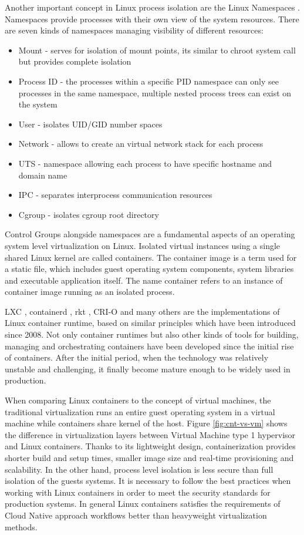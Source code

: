 \documentclass[
  digital, %
  twoside, %
  table,   %
  lof,     %
  lot,     %
]{fithesis3}
\begin{document}
Another important concept in Linux process isolation are the Linux Namespaces \cite{linux_namespaces}. Namespaces provide processes with their own view of the system resources. There are seven kinds of namespaces managing visibility of different resources:
\begin{itemize}
  \item Mount - serves for isolation of mount points, its similar to chroot system call but provides complete isolation
  \item Process ID - the processes within a specific PID namespace can only see processes in the same namespace, multiple nested process trees can exist on the system
  \item User - isolates UID/GID number spaces
  \item Network - allows to create an virtual network stack for each process
  \item UTS - namespace allowing each process to have specific hostname and domain name
  \item IPC - separates interprocess communication resources
  \item Cgroup - isolates cgroup root directory
\end{itemize}

Control Groups alongside namespaces are a fundamental aspects of an operating system level virtualization on Linux. Isolated virtual instances using a single shared Linux kernel are called containers. The container image is a term used for a static file, which includes guest operating system components, system libraries and executable application itself. The name container refers to an instance of container image running as an isolated process.

LXC \cite{lxc}, containerd \cite{containerd}, rkt \cite{rkt}, CRI-O \cite{cri-o} and many others are the implementations of Linux container runtime, based on similar principles which have been introduced since 2008. Not only container runtimes but also other kinds of tools for building, managing and orchestrating containers have been developed since the initial rise of containers. After the initial period, when the technology was relatively unstable and challenging, it finally become mature enough to be widely used in production.

When comparing Linux containers to the concept of virtual machines, the traditional virtualization runs an entire guest operating system in a virtual machine while containers share kernel of the host. Figure \ref{fig:cnt-vs-vm} shows the difference in virtualization layers between Virtual Machine type 1 hypervisor \cite{hypervisors} and Linux containers. Thanks to its lightweight design, containerization provides shorter build and setup times, smaller image size and real-time provisioning and scalability. In the other hand, process level isolation is less secure than full isolation of the guests systems. It is necessary to follow the best practices when working with Linux containers in order to meet the security standards for production systems. In general Linux containers satisfies the requirements of Cloud Native approach workflows better than heavyweight virtualization methods.
\end{document}
